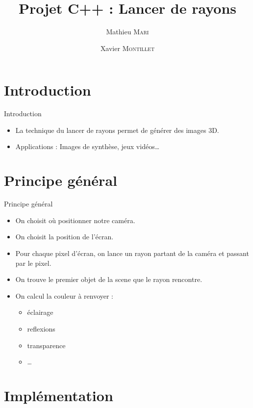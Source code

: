 \documentclass{beamer}
\title{Projet C++ : Lancer de rayons}
\author{Mathieu \textsc{Mari} \and Xavier \textsc{Montillet}}
\begin{document}
\begin{frame}
	\titlepage
\end{frame}
	
\section{Introduction}
	\begin{frame}{Introduction}
		\begin{itemize}
			\item La technique du lancer de rayons permet de générer des images 3D.
			\item Applications : Images de synthèse, jeux vidéos\dots
		\end{itemize}
	\end{frame}
\section{Principe général}
	\begin{frame}
	\begin{block}{Principe général}
	\begin{itemize}
		\item On choisit où positionner notre caméra.
		\item On choisit la position de l'écran.
		\item Pour chaque pixel d'écran, on lance un rayon partant de la caméra et passant par le pixel.
		\item On trouve le premier objet de la scene que le rayon rencontre.
		\item On calcul la couleur à renvoyer : 
			\begin{itemize}	
				\item éclairage
				\item reflexions
				\item transparence	
				\item \dots
			\end{itemize}		
	\end{itemize}
	\end{block}
	\end{frame}
	
\section{Implémentation}
\end{document}
